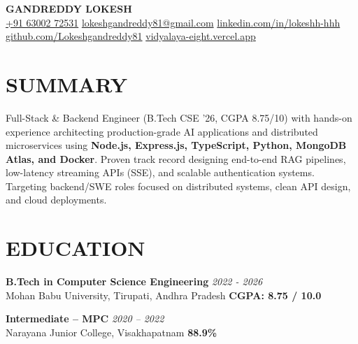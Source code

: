 \documentclass[a4paper,9.5pt]{article}
\begin{document}
\begin{center}
    {\LARGE \textbf{\color{headcolor}GANDREDDY LOKESH}} \\[4pt]
    \small
    \href{tel:+916300272531}{+91 63002 72531}
    \quad\textbar\quad
    \href{mailto:lokeshgandreddy81@gmail.com}{lokeshgandreddy81@gmail.com}
    \quad\textbar\quad
    \href{https://linkedin.com/in/lokeshh-hhh}{linkedin.com/in/lokeshh-hhh}
    \quad\textbar\quad
    \href{https://github.com/Lokeshgandreddy81}{github.com/Lokeshgandreddy81}
    \quad\textbar\quad
    \href{https://vidyalaya-eight.vercel.app}{vidyalaya-eight.vercel.app}
\end{center}

\section*{SUMMARY}
Full-Stack \& Backend Engineer (B.Tech CSE '26, CGPA 8.75/10) with hands-on experience architecting production-grade AI applications and distributed microservices using \textbf{Node.js, Express.js, TypeScript, Python, MongoDB Atlas, and Docker}. Proven track record designing end-to-end RAG pipelines, low-latency streaming APIs (SSE), and scalable authentication systems. Targeting backend/SWE roles focused on distributed systems, clean API design, and cloud deployments.

\section*{EDUCATION}
\textbf{B.Tech in Computer Science Engineering} \hfill \textit{2022 - 2026}\\
Mohan Babu University, Tirupati, Andhra Pradesh \hfill \textbf{CGPA: 8.75 / 10.0}

\smallskip
\noindent\textbf{Intermediate -- MPC} \hfill \textit{2020 -- 2022}\\
Narayana Junior College, Visakhapatnam \hfill \textbf{88.9\%}

\end{document}
